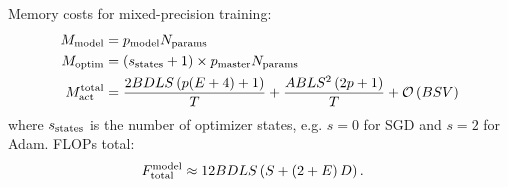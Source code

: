 \documentclass[11pt]{article}
\begin{document}
Memory costs for mixed-precision training:
\begin{align}
	M _{ {\rm model} }                   & =p _{ {\rm model} } N _{ {\rm params} } \nonumber\\
	M _{ {\rm optim} }                   & =  \left ( s _{ {\rm states} }+1 \right) \times p _{ {\rm master } } N _{ {\rm params} } \nonumber\\
	M _{ {\rm act}  } ^{ {\rm  total}  } & =\frac{ 2BDLS   \left ( p(E+4) + 1   \right ) }{ T }
	+ \frac{ ABLS ^{ 2 } \left ( 2p+1\right ) }{ T }  + \mathcal{O} \left( BSV \right)
\end{align}
where $ s _{ {\rm  states} } $ is the number of optimizer states, e.g. $ s=0 $ for SGD and $ s=2 $
for Adam. FLOPs total:
\begin{align}
	F _{ {\rm total}  } ^{ {\rm  model}  } & \approx 12 BDLS \left ( S + \left ( 2+E \right )D \right ) .
\end{align}





\end{document}
